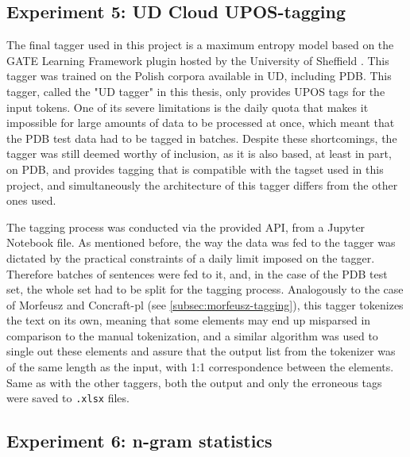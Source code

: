 \subsection{Experiment 5: UD Cloud UPOS-tagging}
\label{subsec:ud-tagging}

The final tagger used in this project is a maximum entropy model based on the GATE Learning Framework plugin hosted by the University of Sheffield \citep{gatecloud}. This tagger was trained on the Polish corpora available in UD, including PDB. This tagger, called the "UD tagger" in this thesis, only provides UPOS tags for the input tokens. One of its severe limitations is the daily quota that makes it impossible for large amounts of data to be processed at once, which meant that the PDB test data had to be tagged in batches. Despite these shortcomings, the tagger was still deemed worthy of inclusion, as it is also based, at least in part, on PDB, and provides tagging that is compatible with the tagset used in this project, and simultaneously the architecture of this tagger differs from the other ones used.

The tagging process was conducted via the provided API, from a Jupyter Notebook file. As mentioned before, the way the data was fed to the tagger was dictated by the practical constraints of a daily limit imposed on the tagger. Therefore batches of sentences were fed to it, and, in the case of the PDB test set, the whole set had to be split for the tagging process. Analogously to the case of Morfeusz and Concraft-pl (see \autoref{subsec:morfeusz-tagging}), this tagger tokenizes the text on its own, meaning that some elements may end up misparsed in comparison to the manual tokenization, and a similar algorithm was used to single out these elements and assure that the output list from the tokenizer was of the same length as the input, with 1:1 correspondence between the elements. Same as with the other taggers, both the output and only the erroneous tags were saved to \texttt{.xlsx} files.

\subsection{Experiment 6: n-gram statistics}
\label{subsec:ngrams}

